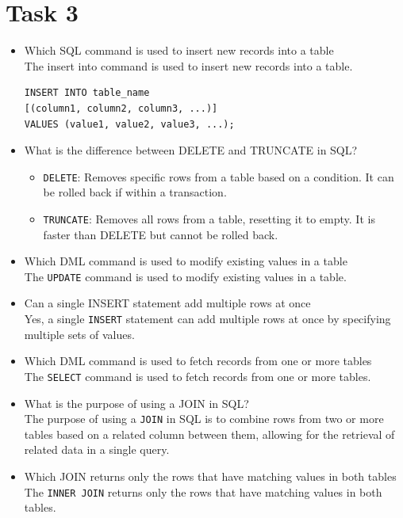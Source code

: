 \documentclass[12pt,a4paper]{article}
\begin{document}
\pagebreak

\section{Task 3}

\begin{itemize}
\item Which SQL command is used to insert new records into a table \\
The insert into command is used to insert new records into a table.
    \begin{verbatim}
INSERT INTO table_name
[(column1, column2, column3, ...)] 
VALUES (value1, value2, value3, ...);
    \end{verbatim}
\item What is the difference between DELETE and TRUNCATE in SQL\@?
\begin{itemize}
    \item \texttt{DELETE}: Removes specific rows from a table based on a condition. It can be rolled back if within a transaction.
    \item \texttt{TRUNCATE}: Removes all rows from a table, resetting it to empty. It is faster than DELETE but cannot be rolled back.
\end{itemize}

\item Which DML command is used to modify existing values in a table \\
The \texttt{UPDATE} command is used to modify existing values in a table.

\item Can a single INSERT statement add multiple rows at once \\
Yes, a single \texttt{INSERT} statement can add multiple rows at once by specifying multiple sets of values.

\item Which DML command is used to fetch records from one or more tables \\
The \texttt{SELECT} command is used to fetch records from one or more tables.

\item What is the purpose of using a JOIN in SQL\@? \\
The purpose of using a \texttt{JOIN} in SQL is to combine rows from two or more tables based on a related column between them, allowing for the retrieval of related data in a single query.

\item Which JOIN returns only the rows that have matching values in both tables \\ 
The \texttt{INNER JOIN} returns only the rows that have matching values in both tables.


\end{itemize}
\end{document}
